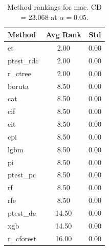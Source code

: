 \begin{table}[h]
\centering
\caption{Method rankings for mae. CD = 23.068 at $\alpha=0.05$.}
\label{tab:ranks_mae}
\begin{tabular}{lcc}
\toprule
Method & Avg Rank & Std \\
\midrule
et & 2.00 & 0.00 \\
ptest_rdc & 2.00 & 0.00 \\
r_ctree & 2.00 & 0.00 \\
boruta & 8.50 & 0.00 \\
cat & 8.50 & 0.00 \\
cif & 8.50 & 0.00 \\
cit & 8.50 & 0.00 \\
cpi & 8.50 & 0.00 \\
lgbm & 8.50 & 0.00 \\
pi & 8.50 & 0.00 \\
ptest_pc & 8.50 & 0.00 \\
rf & 8.50 & 0.00 \\
rfe & 8.50 & 0.00 \\
ptest_dc & 14.50 & 0.00 \\
xgb & 14.50 & 0.00 \\
r_cforest & 16.00 & 0.00 \\
\bottomrule
\end{tabular}
\end{table}